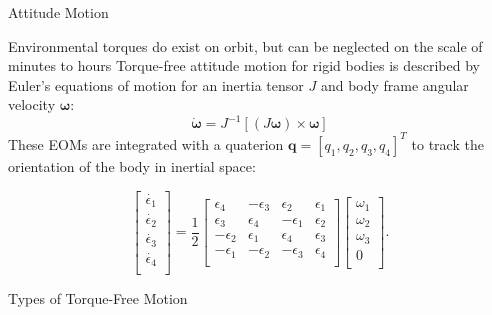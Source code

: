 \documentclass{beamer}
\begin{document}
\begin{frame}{Attitude Motion}
    \begin{outline}
        \1 Environmental torques do exist on orbit, but can be neglected on the scale of minutes to hours
        \1 Torque-free attitude motion for rigid bodies is described by Euler's equations of motion for an inertia tensor $J$ and body frame angular velocity $\mathbf{\omega}$:
        \begin{equation*}
            \dot{\mathbf{\omega}} = J^{-1} \left[ \left(J \mathbf{\omega} \right) \times \mathbf{\omega} \right]
        \end{equation*}
        \1 These EOMs are integrated with a quaterion $\mathbf{q} = \left[q_1, q_2, q_3, q_4 \right]^T$ to track the orientation of the body in inertial space:

        \begin{equation*}
            \left[\begin{matrix}\dot{\epsilon_1}\\\dot{\epsilon_2}\\\dot{\epsilon_3}\\\dot{\epsilon_4}\\\end{matrix}\right]
            =
            \frac{1}{2}\left[\begin{matrix}\epsilon_4&-\epsilon_3&\epsilon_2&\epsilon_1\\\epsilon_3&\epsilon_4&-\epsilon_1&\epsilon_2\\-\epsilon_2&\epsilon_1&\epsilon_4&\epsilon_3\\-\epsilon_1&-\epsilon_2&-\epsilon_3&\epsilon_4\\\end{matrix}\right]
            \left[\begin{matrix}\omega_1\\\omega_2\\\omega_3\\0\\\end{matrix}\right].
        \end{equation*}
    \end{outline}
\end{frame}

\begin{frame}{Types of Torque-Free Motion}
\end{frame}
\end{document}
